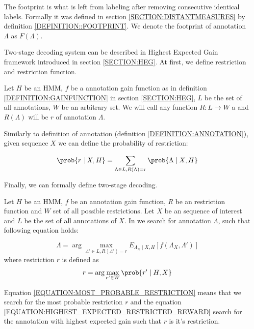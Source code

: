 The footprint is what is left from labeling after removing consecutive identical
labels. Formally it was defined in section \ref{SECTION:DISTANTMEASURES} by
definition \ref{DEFINITION::FOOTPRINT}.  We denote the footprint of annotation
$\Lambda$ as $F(\Lambda)$.

Two-stage decoding system can be described in Highest Expected Gain framework
introduced in section \ref{SECTION:HEG}. At first, we define restriction and
restriction function.

\begin{definition}
Let $H$ be an HMM, $f$ be a annotation gain function as in definition
\ref{DEFINITION:GAINFUNCTION} in section \ref{SECTION:HEG}, $L$ be the set of
all annotations, $W$ be an arbitrary set. We will call any function
$R:L\to W$ a  and $R(\Lambda)$ will be
 $r$ of annotation $\Lambda$.

Similarly to definition of annotation (definition \ref{DEFINITION:ANNOTATION}),
given sequence $X$ we can define the probability of restriction:

\begin{equation}
\prob{r\mid X, H} = \sum_{\Lambda \in L, R(\Lambda) = r} \prob{\Lambda\mid X, H}
\end{equation}
\end{definition}

Finally, we can formally define two-stage decoding.

\begin{definition}
Let $H$ be an HMM, $f$ be an annotation gain function, $R$ be an restriction
function and $W$ set of all possible restrictions. Let $X$ be an sequence of
interest and $L$ be the set of all annotations of $X$. In  we search for annotation $\Lambda$, such that following equation
holds:

\begin{equation}
\Lambda = \arg\max_{\Lambda'\in L, R(\Lambda') = r}E_{\Lambda_X\mid
X,H}[f(\Lambda_X,\Lambda')]\label{EQUATION:HIGHEST_EXPECTED_RESTRICTED_REWARD}
\end{equation}
where restriction $r$ is defined as
\begin{equation}
r = \arg\max_{r'\in W}\prob{r'\mid H, X}
\label{EQUATION:MOST_PROBABLE_RESTRICTION}
\end{equation}
\end{definition}
Equation \ref{EQUATION:MOST_PROBABLE_RESTRICTION} means that we search for the
most probable restriction $r$ and the equation
\ref{EQUATION:HIGHEST_EXPECTED_RESTRICTED_REWARD} search for the annotation 
with highest expected gain such that $r$ is it's restriction.

